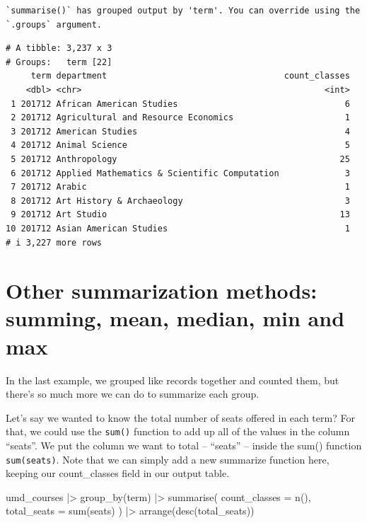 \documentclass[
  letterpaper,
  DIV=11,
  numbers=noendperiod]{scrreprt}
\newenvironment{Shaded}{\begin{snugshade}}{\end{snugshade}}
\newcommand{\AttributeTok}[1]{\textcolor[rgb]{0.40,0.45,0.13}{#1}}
\newcommand{\FunctionTok}[1]{\textcolor[rgb]{0.28,0.35,0.67}{#1}}
\newcommand{\NormalTok}[1]{\textcolor[rgb]{0.00,0.23,0.31}{#1}}
\newcommand{\SpecialCharTok}[1]{\textcolor[rgb]{0.37,0.37,0.37}{#1}}
\begin{document}
\begin{verbatim}
`summarise()` has grouped output by 'term'. You can override using the
`.groups` argument.
\end{verbatim}

\begin{verbatim}
# A tibble: 3,237 x 3
# Groups:   term [22]
     term department                                   count_classes
    <dbl> <chr>                                                <int>
 1 201712 African American Studies                                 6
 2 201712 Agricultural and Resource Economics                      1
 3 201712 American Studies                                         4
 4 201712 Animal Science                                           5
 5 201712 Anthropology                                            25
 6 201712 Applied Mathematics & Scientific Computation             3
 7 201712 Arabic                                                   1
 8 201712 Art History & Archaeology                                3
 9 201712 Art Studio                                              13
10 201712 Asian American Studies                                   1
# i 3,227 more rows
\end{verbatim}

\hypertarget{other-summarization-methods-summing-mean-median-min-and-max}{%
\section{Other summarization methods: summing, mean, median, min and
max}\label{other-summarization-methods-summing-mean-median-min-and-max}}

In the last example, we grouped like records together and counted them,
but there's so much more we can do to summarize each group.

Let's say we wanted to know the total number of seats offered in each
term? For that, we could use the \texttt{sum()} function to add up all
of the values in the column ``seats''. We put the column we want to
total -- ``seats'' -- inside the sum() function \texttt{sum(seats)}.
Note that we can simply add a new summarize function here, keeping our
count\_classes field in our output table.

\begin{Shaded}
\begin{Highlighting}[]
\NormalTok{umd\_courses }\SpecialCharTok{|\textgreater{}}
  \FunctionTok{group\_by}\NormalTok{(term) }\SpecialCharTok{|\textgreater{}}
  \FunctionTok{summarise}\NormalTok{(}
    \AttributeTok{count\_classes =} \FunctionTok{n}\NormalTok{(),}
    \AttributeTok{total\_seats =} \FunctionTok{sum}\NormalTok{(seats)}
\NormalTok{  ) }\SpecialCharTok{|\textgreater{}}
  \FunctionTok{arrange}\NormalTok{(}\FunctionTok{desc}\NormalTok{(total\_seats))}
\end{Highlighting}
\end{Shaded}
\end{document}

